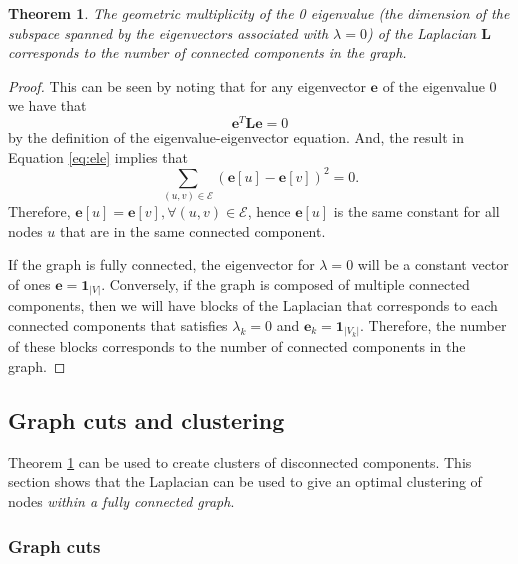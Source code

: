 \documentclass[twocolumn]{article}
\theoremstyle{plain}
\newtheorem{theorem}{Theorem}[section]
\begin{document}
\begin{theorem} \label{thm:connected_components}
    The geometric multiplicity of the 0 eigenvalue (the dimension of the subspace spanned by the eigenvectors associated with $\lambda = 0$) of the Laplacian $\mathbf{L}$ corresponds to the number of connected components in the graph.
\end{theorem}
\begin{proof}
    This can be seen by noting that for any eigenvector $\mathbf{e}$ of the eigenvalue $0$ we have that 
    \begin{equation} \label{eq:ele}
        \mathbf{e}^T\mathbf{L}\mathbf{e} = 0
    \end{equation}
    by the definition of the eigenvalue-eigenvector equation. And, the result in Equation \ref{eq:ele} implies that 
    \begin{equation}
        \sum_{(u,v) \in \mathcal{E}}(\mathbf{e}[u] - \mathbf{e}[v])^2 = 0.
    \end{equation}
    Therefore, $\mathbf{e}[u] = \mathbf{e}[v], \forall(u,v) \in \mathcal{E}$, hence $\mathbf{e}[u]$ is the same constant for all nodes $u$ that are in the same connected component.

    If the graph is fully connected, the eigenvector for $\lambda=0$ will be a constant vector of ones $\mathbf{e} = \mathbf{1}_{|V|}$. Conversely, if the graph is composed of multiple connected components, then we will have blocks of the Laplacian that corresponds to each connected components that satisfies $\lambda_k = 0$ and $\mathbf{e}_k = \mathbf{1}_{|V_k|}$. Therefore, the number of these blocks corresponds to the number of connected components in the graph.
\end{proof}

\subsection{Graph cuts and clustering}

Theorem \ref{thm:connected_components} can be used to create clusters of disconnected components. This section shows that the Laplacian can be used to give an optimal clustering of nodes \textit{within a fully connected graph}.

\subsubsection{Graph cuts}
\end{document}
